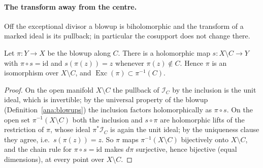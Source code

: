 \paragraph{The transform away from the centre.} Off the exceptional divisor a blowup is biholomorphic and the transform of a marked ideal is its
pullback; in particular the cosupport does not change there.

\begin{lemma}
\label{bcalc:isomorphism-off-centre}
\leanok
Let \(\pi\colon Y\to X\) be the blowup along \(C\). There is a holomorphic map \(s\colon X\setminus C\to Y\) with \(\pi\circ s=\mathrm{id}\) and
\(s(\pi(z))=z\) whenever \(\pi(z)\notin C\). Hence \(\pi\) is an isomorphism over \(X\setminus C\), and \(\operatorname{Exc}(\pi)\subset\pi^{-1}(C)\).
\end{lemma}
\begin{proof}
\leanok
On the open manifold \(X\setminus C\) the pullback of \(\mathcal I_C\) by the inclusion is the unit ideal, which is invertible; by the universal property
of the blowup (Definition~\ref{ana:blowups}) the inclusion factors holomorphically as \(\pi\circ s\). On the open set \(\pi^{-1}(X\setminus C)\) both the
inclusion and \(s\circ\pi\) are holomorphic lifts of the restriction of \(\pi\), whose ideal \(\pi^{*}\mathcal I_C\) is again the unit ideal; by the
uniqueness clause they agree, i.e.\ \(s(\pi(z))=z\). So \(\pi\) maps \(\pi^{-1}(X\setminus C)\) bijectively onto \(X\setminus C\), and the chain rule for
\(\pi\circ s=\mathrm{id}\) makes \(d\pi\) surjective, hence bijective (equal dimensions), at every point over \(X\setminus C\).
\end{proof}

